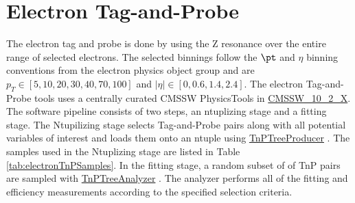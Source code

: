 

\FloatBarrier
\section{Electron Tag-and-Probe }

The electron tag and probe is done by using the Z resonance over the entire \pt range of selected electrons. The selected binnings follow the $\pt$ and $\eta$ binning conventions from the electron physics object group and are $ p_T \in [5, 10, 20, 30, 40, 70, 100]$ and $|\eta| \in [ 0, 0.6, 1.4, 2.4]$. The electron Tag-and-Probe tools uses a centrally curated CMSSW PhysicsTools in \url{CMSSW_10_2_X}. The software pipeline consists of two steps, an ntuplizing stage and a fitting stage. The  Ntupilizing stage selects Tag-and-Probe pairs along with all potential variables of interest and loads them onto an ntuple using \url{TnPTreeProducer} \cite{ElTnPGit}. The samples used in the Ntuplizing stage are listed in Table \ref{tab:electronTnPSamples}. In the fitting stage, a random subset of of TnP pairs are sampled with \url{TnPTreeAnalyzer} \cite{ElTnPAnaGit}. The analyzer performs all of the fitting and efficiency measurements according to the specified selection criteria. 

